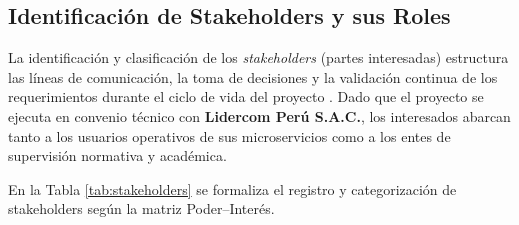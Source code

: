 \subsection{Identificación de Stakeholders y sus Roles}
La identificación y clasificación de los \textit{stakeholders} (partes interesadas) estructura las líneas de comunicación, la toma de decisiones y la validación continua de los requerimientos durante el ciclo de vida del proyecto \parencite{pmi2021pmbok, kendall2019systems}. %
Dado que el proyecto se ejecuta en convenio técnico con \textbf{Lidercom Perú S.A.C.}, los interesados abarcan tanto a los usuarios operativos de sus microservicios como a los entes de supervisión normativa y académica.

En la Tabla \ref{tab:stakeholders} se formaliza el registro y categorización de stakeholders según la matriz Poder--Interés.

